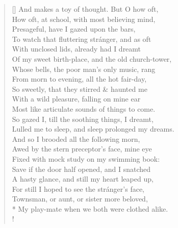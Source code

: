 \documentclass[MAIN]{subfiles}
\begin{document}
\begin{verse}[\versewidth]
{\color{white} And makes a toy of thought.} But O how oft,\\
How oft, at school, with most believing mind,\\
Presageful, have I gazed upon the bars,\\
To watch that fluttering str\'anger, and as oft\\
With unclosed lids, already had I dreamt\\
Of my sweet birth-place, and the old church-tower,\\
Whose bells, the poor man's only music, rang\\
From morn to evening, all the hot fair-day,\\
So sweetly, that they stirred \& haunted me\\
With a wild pleasure, falling on mine ear\\
Most like articulate sounds of things to come.\\
So gazed I, till the soothing things, I dreamt,\\
Lulled me to sleep, and sleep prolonged my dreams.\\
And so I brooded all the following morn,\\
Awed by the stern preceptor's face, mine eye\\
Fixed with mock study on my swimming book:\\
Save if the door half opened, and I snatched\\
A hasty glance, and still my heart leaped up,\\
For still I hoped to see the str\'anger's face,\\
Townsman, or aunt, or sister more beloved,\\*
My play-mate when we both were clothed alike.\\!


\end{verse}
\end{document}
